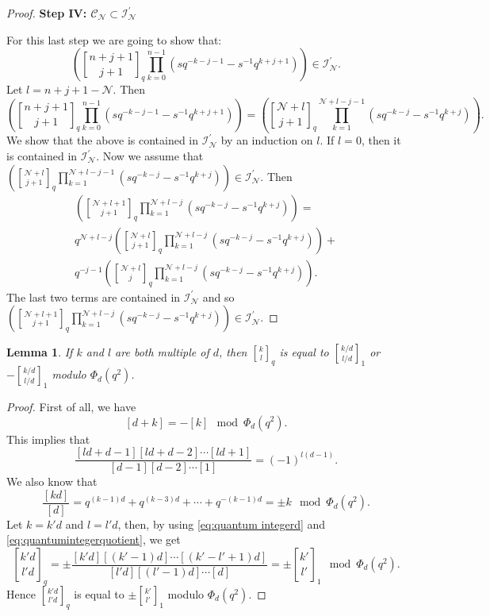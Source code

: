 \documentclass[reqno,a4paper,11pt]{amsart}
\numberwithin{equation}{section}
\numberwithin{figure}{section}
\theoremstyle{definition}
\theoremstyle{plain}
\newtheorem{lem}[defn]{Lemma}
\newcommand{\cC}{\mathcal{C}}
\newcommand{\cI}{\mathcal{I}}
\newcommand{\cN}{\mathcal{N}}
\begin{document}
\begin{proof}
\par
%
{\bf Step IV: $\cC_{\cN}\subset \cI_{\cN}^\prime$} 
%
\par
For this last step we are going to show that:
\begin{equation*}
\left( {n+j+1 \brack j+1}_q \prod_{k=0}^{n-1}(sq^{-k-j-1}-s^{-1}q^{k+j+1}) \right) 
\in \cI_\cN^\prime.
\end{equation*}
Let $l = n+j+1 - \cN$.  
Then
\begin{equation*}
\left( {n+j+1 \brack j+1}_q \prod_{k=0}^{n-1}(sq^{-k-j-1}-s^{-1}q^{k+j+1}) \right)
=
\left( {\cN+l \brack j+1}_q \prod_{k=1}^{\cN+l-j-1}(sq^{-k-j}-s^{-1}q^{k+j}) \right).
\end{equation*}
We show that the above is contained in $\cI_\cN^\prime$ by an induction on $l$.  
If $l=0$, then it is contained in $\cI_\cN^\prime$.  
Now we assume that $\left( {\cN+l \brack j+1}_q \prod_{k=1}^{\cN+l-j-1}(sq^{-k-j}-s^{-1}q^{k+j}) \right) \in \cI_\cN^\prime$.  
Then
\begin{multline*}
\left( {\cN+l+1 \brack j+1}_q \prod_{k=1}^{\cN+l-j}(sq^{-k-j}-s^{-1}q^{k+j}) \right)
=
\\
q^{\cN+l-j}\left( {\cN+l \brack j+1}_q \prod_{k=1}^{\cN+l-j}(sq^{-k-j}-s^{-1}q^{k+j}) \right)
+
\\
q^{-j-1}\left( {\cN+l \brack j}_q \prod_{k=1}^{\cN+l-j}(sq^{-k-j}-s^{-1}q^{k+j}) \right).  
\end{multline*}
The last  two terms are contained in $\cI_\cN^\prime$ and so
$\left( {\cN+l+1 \brack j+1}_q \prod_{k=1}^{\cN+l-j}(sq^{-k-j}-s^{-1}q^{k+j}) \right) \in \cI_\cN^\prime$.  
\end{proof}
%
\begin{lem}\label{lem:qi}
If $k$ and $l$ are both multiple of $d$, then ${k \brack l}_q$
is equal to ${k/d \brack l/d}_1$ or $-{k/d \brack l/d}_1$ modulo $\Phi_d(q^2)$.  
\end{lem}
%
\begin{proof}
First of all, we have
\[
[d + k] = -[k] \mod \Phi_d(q^2).  
\]
This implies that
\begin{equation}\label{eq:quantum integerd}
\frac{[ld + d-1][ld+d-2]\cdots[ld+1]}
{[d-1][d-2]\cdots[1]} = (-1)^{l(d-1)}.  
\end{equation}
We also know that
\begin{equation}\label{eq:quantumintegerquotient}
\frac{[kd]}{[d]} = 
q^{(k-1)d} + q^{(k-3)d} + \cdots + q^{-(k-1)d}
= \pm k \mod \Phi_d(q^2).  
\end{equation}
Let $k = k'd$ and $l = l'd$, then, by using \eqref{eq:quantum integerd} and \eqref{eq:quantumintegerquotient}, we get
\begin{equation*}
{k'd \brack l'd}_q 
=
\pm \frac{[k'd][(k'-1)d]\cdots [(k'-l'+1)d]}
{[l'd][(l'-1)d]\cdots[d]}
=
\pm {k' \brack l'}_1 \mod \Phi_d(q^2).  
\end{equation*}
Hence ${k'd \brack l'd}_q$ is equal to $\pm {k' \brack l'}_1$ modulo $\Phi_d(q^2)$.  
\end{proof}
\end{document}
